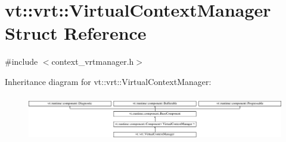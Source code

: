 \hypertarget{structvt_1_1vrt_1_1_virtual_context_manager}{}\section{vt\+:\+:vrt\+:\+:Virtual\+Context\+Manager Struct Reference}
\label{structvt_1_1vrt_1_1_virtual_context_manager}


{\ttfamily \#include $<$context\+\_\+vrtmanager.\+h$>$}

Inheritance diagram for vt\+:\+:vrt\+:\+:Virtual\+Context\+Manager\+:\begin{figure}[H]
\begin{center}
\leavevmode
\includegraphics[height=2.034514cm]{structvt_1_1vrt_1_1_virtual_context_manager}
\end{center}
\end{figure}
